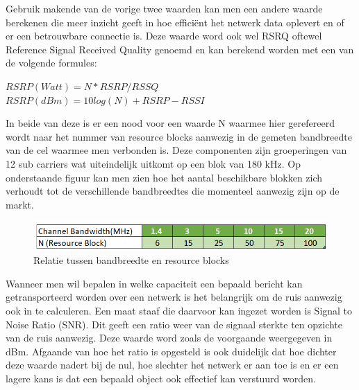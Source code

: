 Gebruik makende van de vorige twee waarden kan men een andere waarde berekenen die meer inzicht geeft in hoe efficiënt het netwerk data oplevert en of er een betrouwbare connectie is. \autocite{Apostu2024} Deze waarde word ook wel RSRQ oftewel Reference Signal Received Quality genoemd en kan berekend worden met een van de volgende formules:

$ RSRP (Watt) = N * RSRP / RSSQ $ \\
$ RSRP (dBm) = 10 log (N) + RSRP - RSSI $

In beide van deze is er een nood voor een waarde N waarmee hier gerefereerd wordt naar het nummer van resource blocks aanwezig in de gemeten bandbreedte van de cel waarmee men verbonden is. \autocite{Kovadloff2021} Deze componenten zijn groeperingen van 12 sub carriers wat uiteindelijk uitkomt op een blok van 180 kHz. \autocite{Mishra2018} Op onderstaande figuur kan men zien hoe het aantal beschikbare blokken zich verhoudt tot de verschillende bandbreedtes die momenteel aanwezig zijn op de markt. 

\begin{figure}[ht]
    \includegraphics[width=1\linewidth]{graphics/bandwithandRB}
    \caption[Relatie tussen bandbreedte en resource blocks]{Relatie tussen bandbreedte en resource blocks \autocite{Kovadloff2021}}
    \label{fig:bandwithandrb}
\end{figure}

Wanneer men wil bepalen in welke capaciteit een bepaald bericht kan getransporteerd worden over een netwerk is het belangrijk om de ruis aanwezig ook in te calculeren. Een maat staaf die daarvoor kan ingezet worden is Signal to Noise Ratio (SNR). Dit geeft een ratio weer van de signaal sterkte ten opzichte van de ruis aanwezig. Deze waarde word zoals de voorgaande weergegeven in dBm. Afgaande van hoe het ratio is opgesteld is ook duidelijk dat hoe dichter deze waarde nadert bij de nul, hoe slechter het netwerk er aan toe is en er een lagere kans is dat een bepaald object ook effectief kan verstuurd worden.  \autocite{Sheldon2021}


